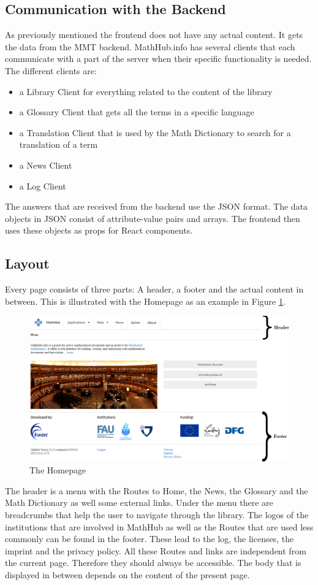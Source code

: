 \documentclass[11pt,a4paper]{article}
\begin{document}
\subsection{Communication with the Backend}
As previously mentioned the frontend does not have any actual content.
It gets the data from the MMT backend.
MathHub.info has several clients that each communicate with a part of the server when their specific functionality is needed.
The different clients are:
\begin{itemize}
\item a Library Client for everything related to the content of the library
\item a Glossary Client that gets all the terms in a specific language
\item a Translation Client that is used by the Math Dictionary to search for a translation of a term 
\item a News Client
\item a Log Client
\end{itemize}
The answers that are received from the backend use the JSON format.
The data objects in JSON consist of attribute-value pairs and arrays.
The frontend then uses these objects as props for React components.

\subsection{Layout}
Every page consists of three parts: A header, a footer and the actual content in between.
This is illustrated with the Homepage as an example in Figure \ref{fig:home}.
\begin{figure}[H]
\includegraphics[width=1\textwidth]{home2.png}
\caption{The Homepage}
\label{fig:home}
\end{figure}
The header is a menu with the Routes to Home, the News, the Glossary and the Math Dictionary as well some external links.
Under the menu there are breadcrumbs that help the user to navigate through the library.
\newline \newline
The logos of the institutions that are involved in MathHub as well as the Routes that are used less commonly can be found in the footer.
These lead to the log, the licenses, the imprint and the privacy policy.
All these Routes and links are independent from the current page.
Therefore they should always be accessible.
The body that is displayed in between depends on the content of the present page.
\end{document}
